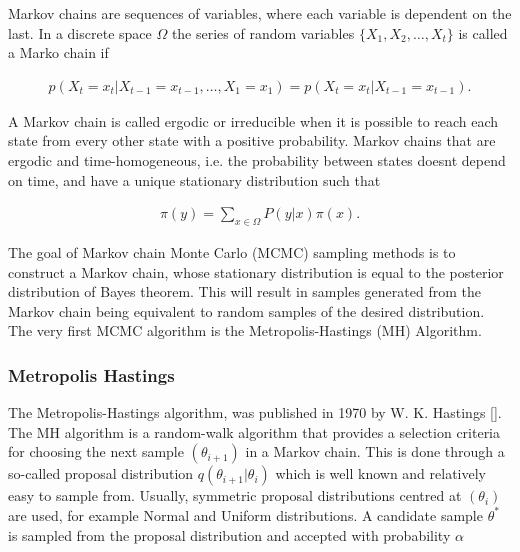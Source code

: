 \label{16362866232034031076}{}


Markov chains are sequences of variables, where each variable is dependent on the last. In a discrete space \(\Omega\) the series of random variables \(\{X_1,X_2,\ldots,X_t\}\) is called a Marko chain if



\begin{equation*}
\begin{split}p(X_t=x_t|X_{t-1}=x_{t-1},\ldots,X_1=x_1) = p(X_t=x_t|X_{t-1}=x_{t-1}) .\end{split}\end{equation*}


A Markov chain is called ergodic or irreducible when it is possible to reach each state from every other state with a positive probability. Markov chains that are ergodic and time-homogeneous, i.e. the probability between states doesn{\textquotesingle}t depend on time, and have a unique stationary distribution such that



\begin{equation*}
\begin{split}\pi(y) = \sum_{x\in\Omega}P(y|x)\pi(x).\end{split}\end{equation*}


The goal of Markov chain Monte Carlo (MCMC) sampling methods is to construct a Markov chain, whose stationary distribution is equal to the posterior distribution of Bayes{\textquotesingle} theorem. This will result in samples generated from the Markov chain being equivalent to random samples of the desired distribution. The very first MCMC algorithm is the Metropolis-Hastings (MH) Algorithm.



\subsubsection{Metropolis Hastings}



\label{17725367994195865305}{}


The Metropolis-Hastings algorithm, was published in 1970 by W. K. Hastings []. The MH algorithm is a random-walk algorithm that provides a selection criteria for choosing the next sample \((\theta_{i + 1})\) in a Markov chain. This is done through a so-called proposal distribution \(q(\theta_{i + 1}|\theta_i)\) which is well known and relatively easy to sample from. Usually, symmetric proposal distributions centred at \((\theta_i)\) are used, for example Normal and Uniform distributions. A candidate sample \(\theta^*\) is sampled from the proposal distribution and accepted with probability \(\alpha\)



